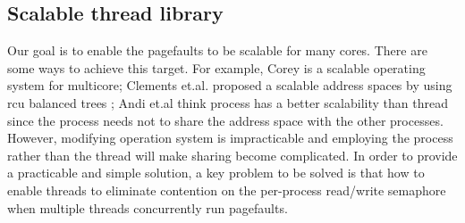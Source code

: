 




\subsection{Scalable thread library}

Our goal is to enable the pagefaults to be scalable  for many cores.
There are some ways to achieve this target. 
For example, Corey\cite{boyd2008corey} is a scalable operating system for multicore;
Clements et.al. proposed a scalable address spaces by using rcu balanced trees \cite{Clements2012Scalable};
Andi et.al think process has a better scalability than thread since the process needs not to share the address space with the other processes\cite{Andi2009lmulticore}.
However, modifying operation system is impracticable and employing the process rather than the thread will make sharing become complicated. 
In order to provide a practicable and simple solution, a key problem to be solved is that how to enable threads to eliminate contention on the per-process read/write semaphore when multiple threads concurrently run pagefaults.





